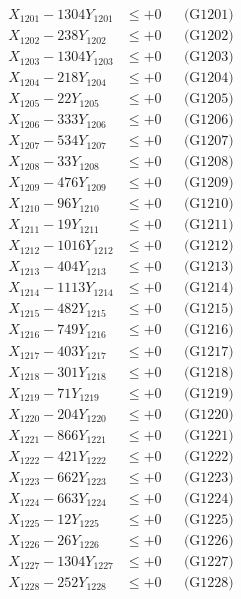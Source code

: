 \documentclass[a4paper,10pt]{article}
\begin{document}
{\begin{align}
\allowbreak
X_{1201} - 1304Y_{1201} &\leq +0 && \text{(G1201)} \\
X_{1202} - 238Y_{1202} &\leq +0 && \text{(G1202)} \\
X_{1203} - 1304Y_{1203} &\leq +0 && \text{(G1203)} \\
X_{1204} - 218Y_{1204} &\leq +0 && \text{(G1204)} \\
X_{1205} - 22Y_{1205} &\leq +0 && \text{(G1205)} \\
X_{1206} - 333Y_{1206} &\leq +0 && \text{(G1206)} \\
X_{1207} - 534Y_{1207} &\leq +0 && \text{(G1207)} \\
X_{1208} - 33Y_{1208} &\leq +0 && \text{(G1208)} \\
X_{1209} - 476Y_{1209} &\leq +0 && \text{(G1209)} \\
X_{1210} - 96Y_{1210} &\leq +0 && \text{(G1210)} \\
\allowbreak
X_{1211} - 19Y_{1211} &\leq +0 && \text{(G1211)} \\
X_{1212} - 1016Y_{1212} &\leq +0 && \text{(G1212)} \\
X_{1213} - 404Y_{1213} &\leq +0 && \text{(G1213)} \\
X_{1214} - 1113Y_{1214} &\leq +0 && \text{(G1214)} \\
X_{1215} - 482Y_{1215} &\leq +0 && \text{(G1215)} \\
X_{1216} - 749Y_{1216} &\leq +0 && \text{(G1216)} \\
X_{1217} - 403Y_{1217} &\leq +0 && \text{(G1217)} \\
X_{1218} - 301Y_{1218} &\leq +0 && \text{(G1218)} \\
X_{1219} - 71Y_{1219} &\leq +0 && \text{(G1219)} \\
X_{1220} - 204Y_{1220} &\leq +0 && \text{(G1220)} \\
\allowbreak
X_{1221} - 866Y_{1221} &\leq +0 && \text{(G1221)} \\
X_{1222} - 421Y_{1222} &\leq +0 && \text{(G1222)} \\
X_{1223} - 662Y_{1223} &\leq +0 && \text{(G1223)} \\
X_{1224} - 663Y_{1224} &\leq +0 && \text{(G1224)} \\
X_{1225} - 12Y_{1225} &\leq +0 && \text{(G1225)} \\
X_{1226} - 26Y_{1226} &\leq +0 && \text{(G1226)} \\
X_{1227} - 1304Y_{1227} &\leq +0 && \text{(G1227)} \\
X_{1228} - 252Y_{1228} &\leq +0 && \text{(G1228)} \\

\end{align}}
\end{document}
